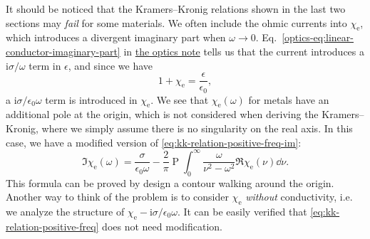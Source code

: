 \documentclass[hyperref, a4paper]{article}
\DeclareMathOperator{\primevalue}{P}
\newcommand*{\ii}{\mathrm{i}}
\newcommand{\opticsdoc}{\href{../optics/optics}{the optics note}}
\begin{document}
It should be noticed that the Kramers–Kronig relations shown in the last two sections may \emph{fail} for some materials.
We often include the ohmic currents into $\chi_\text{e}$, which introduces a divergent imaginary part when $\omega \to 0$.
Eq.~\eqref{optics-eq:linear-conductor-imaginary-part} in \opticsdoc{} tells us that the current introduces a $\ii \sigma / \omega$ term in $\epsilon$, and since we have 
\begin{equation}
    1 + \chi_\text{e} = \frac{\epsilon}{\epsilon_0},
\end{equation}
a $\ii \sigma / \epsilon_0 \omega$ term is introduced in $\chi_\text{e}$.
We see that $\chi_\text{e}(\omega)$ for metals have an additional pole at the origin, which is not considered when deriving the Kramers–Kronig, where we simply assume there is no singularity on the real axis.
In this case, we have a modified version of \eqref{eq:kk-relation-positive-freq-im}:
\begin{equation}
    \Im \chi_\text{e}(\omega) = \frac{\sigma}{\epsilon_0 \omega} - \frac{2}{\pi} \primevalue \int_0^\infty \frac{\omega}{\nu^2 - \omega^2} \Re \chi_\text{e}(\nu) \dd{\nu}.
    \label{eq:metal-kk-relation}
\end{equation}
This formula can be proved by design a contour walking around the origin.
Another way to think of the problem is to consider $\chi_\text{e}$ \emph{without} conductivity, i.e. we analyze the structure of $\chi_\text{e} - \ii \sigma / \epsilon_0 \omega$.
It can be easily verified that \eqref{eq:kk-relation-positive-freq} does not need modification.
\end{document}
